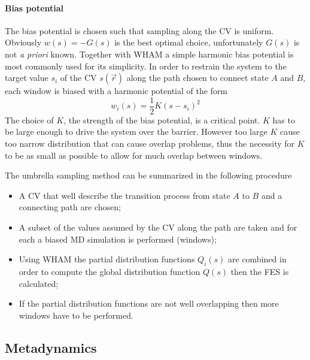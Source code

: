 \paragraph{\textbf{Bias potential}} The bias potential is chosen such that sampling along the \ac{CV} is uniform. Obviously $w(s) = -G(s)$ is the best optimal choice, unfortunately $G(s)$ is not \textit{a priori} known. Together with \ac{WHAM} a simple harmonic bias potential is most commonly used for its simplicity. In order to restrain the system to the target value $s_i$ of the \ac{CV} $s(\vec r)$ along the path chosen to connect state $A$ and $B$, each window is biased with a harmonic potential of the form
\begin{equation*}
	w_i(s) = \frac{1}{2}K (s - s_i)^2
\end{equation*}
The choice of $K$, the strength of the bias potential, is a critical point. $K$ has to be large enough to drive the system over the barrier. However too large $K$ cause too narrow distribution that can cause overlap problems, thus the necessity for $K$ to be as small as possible to allow for much overlap between windows.

The umbrella sampling method can be summarized in the following procedure
\begin{itemize}
	\item A \ac{CV} that well describe the transition process from state $A$ to $B$ and a connecting path are chosen;
	\item A subset of the values assumed by the \ac{CV} along the path are taken and for each a biased \ac{MD} simulation is performed (windows);
	\item Using \ac{WHAM} the partial distribution functions $Q_i(s)$ are combined in order to compute the global distribution function $Q(s)$ then the \ac{FES} is calculated;
	\item If the partial distribution functions are not well overlapping then more windows have to be performed.
\end{itemize}

 
\subsection{Metadynamics}







